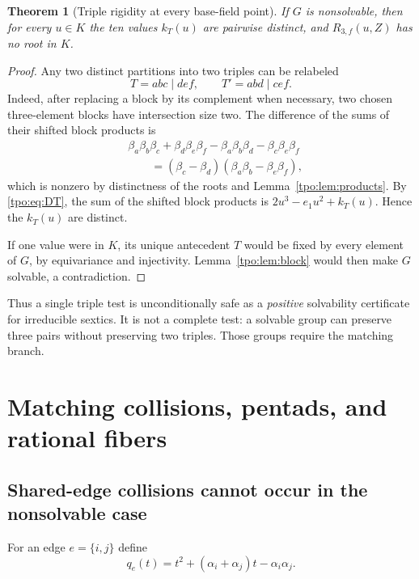 \documentclass[11pt,letterpaper]{article}
\numberwithin{equation}{section}
\newtheorem{theorem}{Theorem}[section]
\theoremstyle{definition}
\theoremstyle{remark}
\newcommand{\Rthree}{R_{3,f}}
\begin{document}
\begin{theorem}[Triple rigidity at every base-field point]
\label{tpo:thm:triple}
If $G$ is nonsolvable, then for every $u\in K$ the ten values $k_T(u)$ are
pairwise distinct, and $\Rthree(u,Z)$ has no root in $K$.
\end{theorem}
\begin{proof}
Any two distinct partitions into two triples can be relabeled
\[
 T=abc\mid def,\qquad T'=abd\mid cef.
\]
Indeed, after replacing a block by its complement when necessary, two chosen
three-element blocks have intersection size two. The difference of the
sums of their shifted block products is
\begin{align*}
 &\beta_a\beta_b\beta_c+\beta_d\beta_e\beta_f
   -\beta_a\beta_b\beta_d-\beta_c\beta_e\beta_f\\
 &\hspace{2em}=(\beta_c-\beta_d)
                  (\beta_a\beta_b-\beta_e\beta_f),
\end{align*}
which is nonzero by distinctness of the roots and Lemma~\ref{tpo:lem:products}.
By \eqref{tpo:eq:DT}, the sum of the shifted block products is
$2u^3-e_1u^2+k_T(u)$. Hence the $k_T(u)$ are distinct.

If one value were in $K$, its unique antecedent $T$ would be fixed by every
element of $G$, by equivariance and injectivity. Lemma~\ref{tpo:lem:block} would
then make $G$ solvable, a contradiction.
\end{proof}

Thus a single triple test is unconditionally safe as a \emph{positive}
solvability certificate for irreducible sextics. It is not a complete test:
a solvable group can preserve three pairs without preserving two triples.
Those groups require the matching branch.

\section{Matching collisions, pentads, and rational fibers}
\label{tpo:sec:pentads}

\subsection{Shared-edge collisions cannot occur in the nonsolvable case}
For an edge $e=\{i,j\}$ define
\begin{equation}
 q_e(t)=t^2+(\alpha_i+\alpha_j)t-\alpha_i\alpha_j.
 \label{tpo:eq:qedge}
\end{equation}
\end{document}

